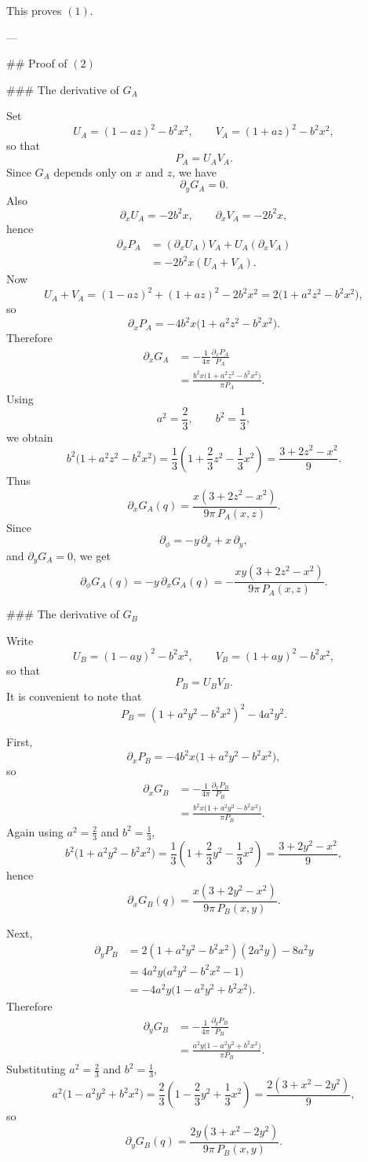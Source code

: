 This proves \((1)\).

---

## Proof of \((2)\)

### The derivative of \(G_A\)

Set
\[
U_A=(1-az)^2-b^2x^2,\qquad V_A=(1+az)^2-b^2x^2,
\]
so that
\[
P_A=U_A V_A.
\]
Since \(G_A\) depends only on \(x\) and \(z\), we have
\[
\partial_y G_A=0.
\]
Also
\[
\partial_x U_A=-2b^2x,\qquad \partial_x V_A=-2b^2x,
\]
hence
\[
\begin{aligned}
\partial_x P_A
&=(\partial_x U_A)V_A+U_A(\partial_x V_A) \\
&=-2b^2x(U_A+V_A).
\end{aligned}
\]
Now
\[
U_A+V_A
=(1-az)^2+(1+az)^2-2b^2x^2
=2\bigl(1+a^2z^2-b^2x^2\bigr),
\]
so
\[
\partial_x P_A=-4b^2x\bigl(1+a^2z^2-b^2x^2\bigr).
\]
Therefore
\[
\begin{aligned}
\partial_x G_A
&=-\frac1{4\pi}\frac{\partial_x P_A}{P_A} \\
&=\frac{b^2x\bigl(1+a^2z^2-b^2x^2\bigr)}{\pi P_A}.
\end{aligned}
\]
Using
\[
a^2=\frac23,\qquad b^2=\frac13,
\]
we obtain
\[
b^2\bigl(1+a^2z^2-b^2x^2\bigr)
=\frac13\left(1+\frac23 z^2-\frac13 x^2\right)
=\frac{3+2z^2-x^2}{9}.
\]
Thus
\[
\partial_x G_A(q)=\frac{x(3+2z^2-x^2)}{9\pi\,P_A(x,z)}.
\]
Since
\[
\partial_\phi=-y\,\partial_x+x\,\partial_y,
\]
and \(\partial_y G_A=0\), we get
\[
\partial_\phi G_A(q)
=-y\,\partial_x G_A(q)
=-\frac{xy(3+2z^2-x^2)}{9\pi\,P_A(x,z)}.
\]

### The derivative of \(G_B\)

Write
\[
U_B=(1-ay)^2-b^2x^2,\qquad V_B=(1+ay)^2-b^2x^2,
\]
so that
\[
P_B=U_BV_B.
\]
It is convenient to note that
\[
P_B=(1+a^2y^2-b^2x^2)^2-4a^2y^2.
\]

First,
\[
\partial_x P_B=-4b^2x\bigl(1+a^2y^2-b^2x^2\bigr),
\]
so
\[
\begin{aligned}
\partial_x G_B
&=-\frac1{4\pi}\frac{\partial_x P_B}{P_B} \\
&=\frac{b^2x\bigl(1+a^2y^2-b^2x^2\bigr)}{\pi P_B}.
\end{aligned}
\]
Again using \(a^2=\frac23\) and \(b^2=\frac13\),
\[
b^2\bigl(1+a^2y^2-b^2x^2\bigr)
=\frac13\left(1+\frac23 y^2-\frac13 x^2\right)
=\frac{3+2y^2-x^2}{9},
\]
hence
\[
\partial_x G_B(q)=\frac{x(3+2y^2-x^2)}{9\pi\,P_B(x,y)}.
\]

Next,
\[
\begin{aligned}
\partial_y P_B
&=2(1+a^2y^2-b^2x^2)(2a^2y)-8a^2y \\
&=4a^2y\bigl(a^2y^2-b^2x^2-1\bigr) \\
&=-4a^2y\bigl(1-a^2y^2+b^2x^2\bigr).
\end{aligned}
\]
Therefore
\[
\begin{aligned}
\partial_y G_B
&=-\frac1{4\pi}\frac{\partial_y P_B}{P_B} \\
&=\frac{a^2y\bigl(1-a^2y^2+b^2x^2\bigr)}{\pi P_B}.
\end{aligned}
\]
Substituting \(a^2=\frac23\) and \(b^2=\frac13\),
\[
a^2\bigl(1-a^2y^2+b^2x^2\bigr)
=\frac23\left(1-\frac23 y^2+\frac13 x^2\right)
=\frac{2(3+x^2-2y^2)}{9},
\]
so
\[
\partial_y G_B(q)=\frac{2y(3+x^2-2y^2)}{9\pi\,P_B(x,y)}.
\]

